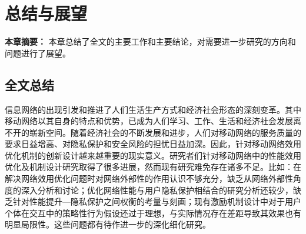 \chapter{总结与展望}
\textbf{本章摘要：} 本章总结了全文的主要工作和主要结论，对需要进一步研究的方向和问题进行了展望。

\section{全文总结}


信息网络的出现引发和推进了人们生活生产方式和经济社会形态的深刻变革。其中移动网络以其自身的特点和优势，已成为人们学习、工作、生活和经济社会发展离不开的崭新空间。随着经济社会的不断发展和进步，人们对移动网络的服务质量的要求日益增高、对隐私保护和安全风险的担忧日益加深。因此，针对移动网络效用优化机制的创新设计越来越重要的现实意义。研究者们针对移动网络中的性能效用优化及机制设计研究取得了很多进展，然而现有研究难免存在诸多不足。比如：在解决网络效用优化问题时对网络外部性的作用认识不够充分，缺乏从网络外部性角度的深入分析和讨论；优化网络性能与用户隐私保护相结合的研究分析还较少，缺乏针对性能提升—隐私保护之间权衡的考量与刻画；现有激励机制设计中对于用户个体在交互中的策略性行为假设还过于理想，与实际情况存在差距导致其效果也有明显局限性。这些问题都有待作进一步的深化细化研究。

